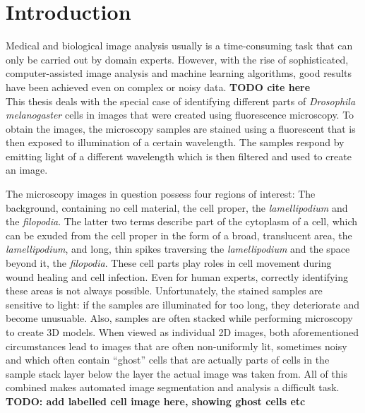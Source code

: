 \chapter{Introduction}
Medical and biological image analysis usually is a time-consuming task that can only be carried out by domain experts. However, with the rise of sophisticated, computer-assisted image analysis and machine learning algorithms, good results have been achieved even on complex or noisy data. \textbf {TODO cite here}\\

\noindent This thesis deals with the special case of identifying different parts of \textit{Drosophila melanogaster} cells in images that were created using fluorescence microscopy. To obtain the images, the microscopy samples are stained using a fluorescent that is then exposed to illumination of a certain wavelength. The samples respond by emitting light of a different wavelength which is then filtered and used to create an image.

The microscopy images in question possess four regions of interest: The background, containing no cell material, the cell proper, the \textit{lamellipodium} and the \textit{filopodia}. The latter two terms describe part of the cytoplasm of a cell, which can be exuded from the cell proper in the form of a broad, translucent area, the \textit{lamellipodium}, and long, thin spikes traversing the \textit{lamellipodium} and the space beyond it, the \textit{filopodia}. These cell parts play roles in cell movement during wound healing and cell infection. Even for human experts, correctly identifying these areas is not always possible. Unfortunately, the stained samples are sensitive to light: if the samples are illuminated for too long, they deteriorate and become unusuable. Also, samples are often stacked while performing microscopy to create 3D models. When viewed as individual 2D images, both aforementioned circumstances lead to images that are often non-uniformly lit, sometimes noisy and which often contain ``ghost'' cells that are actually parts of cells in the sample stack layer below the layer the actual image was taken from. All of this combined makes automated image segmentation and analysis a difficult task.\\
\textbf{TODO: add labelled cell image here, showing ghost cells etc}\\

